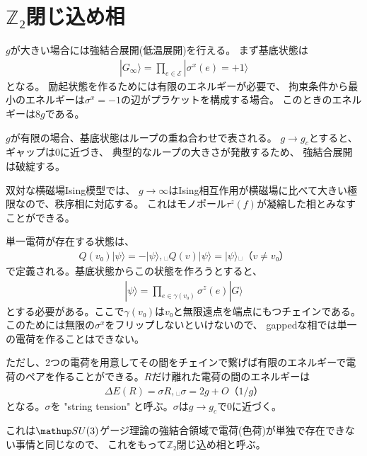 \documentclass[8pt,unicode,xcolor=svgnames]{beamer}
\makeatletter
\newcommand*{\currentname}{\@currentlabelname}
\numberwithin{equation}{section}
\makeatother
\begin{document}
\section{
    $ℤ₂$閉じ込め相
}
\begin{frame}{\currentname}
    $g$が大きい場合には強結合展開(低温展開)を行える。
    まず基底状態は
    \begin{align}
        |𝐺_∞⟩ = ∏_{e ∈ ℰ}|σ^x(e) = +1⟩
    \end{align}
    となる。
    励起状態を作るためには有限のエネルギーが必要で、
    拘束条件から最小のエネルギーは$σ^x = -1$の辺がプラケットを構成する場合。
    このときのエネルギーは$8g$である。

    $g$が有限の場合、基底状態はループの重ね合わせで表される。
    $g → g_𝑐$とすると、ギャップは0に近づき、
    典型的なループの大きさが発散するため、
    強結合展開は破綻する。

    双対な横磁場Ising模型では、
    $g → ∞$はIsing相互作用が横磁場に比べて大きい極限なので、秩序相に対応する。
    これはモノポール$τ^z(f)$が凝縮した相とみなすことができる。
\end{frame}
\begin{frame}{\currentname}
    単一電荷が存在する状態は、
    \begin{align}
        Q(v₀)|ψ⟩ = -|ψ⟩,␣ Q(v)|ψ⟩ = |ψ⟩␣（v ≠ v₀）
    \end{align}
    で定義される。基底状態からこの状態を作ろうとすると、
    \begin{align}
        |ψ⟩ = ∏_{e ∈ γ(v₀)}σ^z(e) |𝐺⟩
    \end{align}
    とする必要がある。ここで$γ(v₀)$は$v₀$と無限遠点を端点にもつチェインである。
    このためには無限の$σ^x$をフリップしないといけないので、
    gappedな相では単一の電荷を作ることはできない。

    ただし、2つの電荷を用意してその間をチェインで繋げば有限のエネルギーで電荷のペアを作ることができる。$R$だけ離れた電荷の間のエネルギーは
    \begin{align}
        𝛥E(R)  = σR,␣ σ = 2g + O（1/g）
    \end{align}
    となる。$σ$を "string tension" と呼ぶ。$σ$は$g → g_𝑐$で0に近づく。

    これは$\SU(3)$ゲージ理論の強結合領域で電荷(色荷)が単独で存在できない事情と同じなので、
    これをもって$ℤ₂$閉じ込め相と呼ぶ。
\end{frame}
\end{document}
